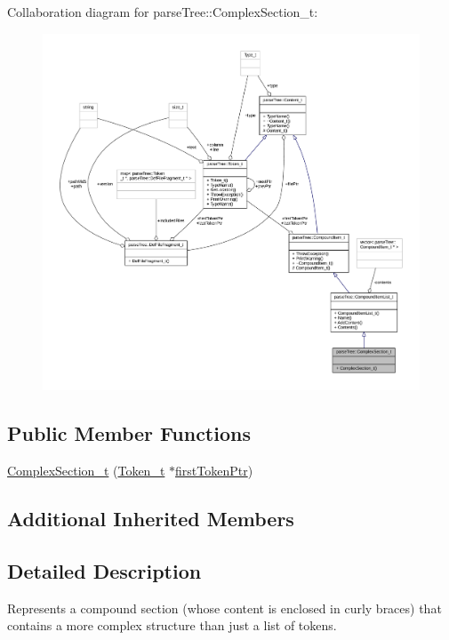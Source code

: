 Collaboration diagram for parse\+Tree\+:\+:Complex\+Section\+\_\+t\+:
\nopagebreak
\begin{figure}[H]
\begin{center}
\leavevmode
\includegraphics[width=350pt]{structparse_tree_1_1_complex_section__t__coll__graph}
\end{center}
\end{figure}
\subsection*{Public Member Functions}
\begin{DoxyCompactItemize}
\item 
\hyperlink{structparse_tree_1_1_complex_section__t_aebb033a16ff337bedc0760a0de549a29}{Complex\+Section\+\_\+t} (\hyperlink{structparse_tree_1_1_token__t}{Token\+\_\+t} $\ast$\hyperlink{structparse_tree_1_1_compound_item__t_a587020c943e760cb0152dd8cd31e21ef}{first\+Token\+Ptr})
\end{DoxyCompactItemize}
\subsection*{Additional Inherited Members}


\subsection{Detailed Description}
Represents a compound section (whose content is enclosed in curly braces) that contains a more complex structure than just a list of tokens. 

